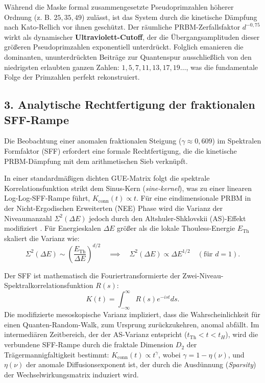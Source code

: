 \documentclass[aps,prl,preprint,superscriptaddress,floatfix]{revtex4-2}
\begin{document}
Während die Maske formal zusammengesetzte Pseudoprimzahlen höherer Ordnung (z. B. $25, 35, 49$) zulässt, ist das System durch die kinetische Dämpfung nach Kato-Rellich vor ihnen geschützt. Der räumliche PRBM-Zerfallsfaktor $d^{-0,75}$ wirkt als dynamischer \textbf{Ultraviolett-Cutoff}, der die Übergangsamplituden dieser größeren Pseudoprimzahlen exponentiell unterdrückt. Folglich emanieren die dominanten, ununterdrückten Beiträge zur Quantenspur ausschließlich von den niedrigsten erlaubten ganzen Zahlen: $1, 5, 7, 11, 13, 17, 19\dots$, was die fundamentale Folge der Primzahlen perfekt rekonstruiert.

\subsection{3. Analytische Rechtfertigung der fraktionalen SFF-Rampe}
Die Beobachtung einer anomalen fraktionalen Steigung ($\gamma \approx 0,609$) im Spektralen Formfaktor (SFF) erfordert eine formale Rechtfertigung, die die kinetische PRBM-Dämpfung mit dem arithmetischen Sieb verknüpft. 

In einer standardmäßigen dichten GUE-Matrix folgt die spektrale Korrelationsfunktion strikt dem Sinus-Kern (\textit{sine-kernel}), was zu einer linearen Log-Log-SFF-Rampe führt, $K_{\text{conn}}(t) \propto t$. Für eine eindimensionale PRBM in der Nicht-Ergodischen Erweiterten (NEE) Phase wird die Varianz der Niveaumanzahl $\Sigma^2(\Delta E)$ jedoch durch den Altshuler-Shklovskii (AS)-Effekt modifiziert \cite{Erdos2013, Erdos2015}. Für Energieskalen $\Delta E$ größer als die lokale Thouless-Energie $E_{\text{Th}}$ skaliert die Varianz wie:
\begin{equation}
\Sigma^2(\Delta E) \sim \left(\frac{E_{\text{Th}}}{\Delta E}\right)^{d/2} \quad \implies \quad \Sigma^2(\Delta E) \propto \Delta E^{1/2} \quad (\text{für } d=1).
\end{equation}

Der SFF ist mathematisch die Fouriertransformierte der Zwei-Niveau-Spektralkorrelationsfunktion $R(s)$:
\begin{equation}
K(t) = \int_{-\infty}^{\infty} R(s) e^{-ist} ds.
\end{equation}
Die modifizierte mesoskopische Varianz impliziert, dass die Wahrscheinlichkeit für einen Quanten-Random-Walk, zum Ursprung zurückzukehren, anomal abfällt. Im intermediären Zeitbereich, der der AS-Varianz entspricht ($t_{\text{Th}} < t < t_H$), wird die verbundene SFF-Rampe durch die fraktale Dimension $D_2$ der Trägermannigfaltigkeit bestimmt: $K_{\text{conn}}(t) \propto t^{\gamma}$, wobei $\gamma = 1 - \eta(\nu)$, und $\eta(\nu)$ der anomale Diffusionsexponent ist, der durch die Ausdünnung (\textit{Sparsity}) der Wechselwirkungsmatrix induziert wird. 
\end{document}
